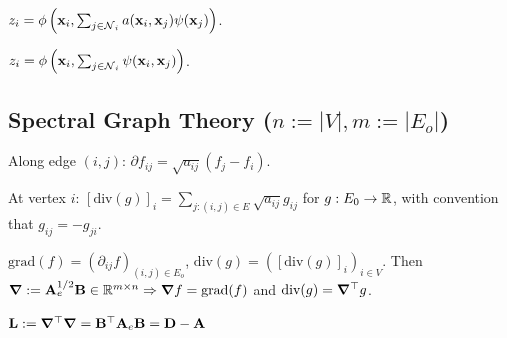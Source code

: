 \begin{definition}
    \(z_i = \phi\left(\vb{x}_i, \sum_{j \in \operatorname{\mathcal{N}}_i} a(\vb{x}_i, \vb{x}_j) \psi(\vb{x}_j)\right)\).
\end{definition}

\begin{definition}
    \(z_i = \phi\left(\vb{x}_i, \sum_{j \in \operatorname{\mathcal{N}}_i} \psi(\vb{x}_i, \vb{x}_j)\right)\).
\end{definition}



\subsection{Spectral Graph Theory (\(n := |V|, m := |E_o|\))}

\begin{definition}
    Along edge \((i, j)\): \(\partial f_{ij} = \sqrt{a_{ij}}(f_j - f_i)\).
\end{definition}

\begin{definition}[Divergence]
    At vertex \(i\): \([\text{div}(g)]_i = \sum_{j: (i, j) \in E} \sqrt{a_{ij}} g_{ij}\) for \(g: E_0 \to \mathbb{R}\), with convention that \(g_{ij} = - g_{ji}\).
\end{definition}

\begin{definition}[Representations]
    \(\text{grad}(f) = (\partial_{ij} f)_{(i,j) \in E_o}\), \(\text{div}(g) = ([\text{div}(g)]_i)_{i \in V}\). Then \(\grad := \vb{A}_e^{1/2} \vb{B} \in \mathbb{R}^{m \times n} \Rightarrow \grad f = \text{grad}(f)\) and \(\text{div}(g) = \grad^\top g\).
\end{definition}

\begin{definition}
    \(\vb{L} := \grad^\top \grad = \vb{B}^\top \vb{A}_e \vb{B} = \vb{D} - \vb{A}\)
\end{definition}

